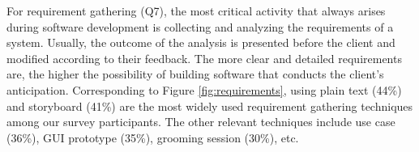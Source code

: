 % 
% 
% 
% 
For requirement gathering (Q7), the most critical activity that always arises
during software development is collecting and analyzing the requirements of a
system. Usually, the outcome of the analysis is presented before the client and
modified according to their feedback. The more clear and detailed requirements
are, the higher the possibility of building software that conducts the client’s
anticipation. Corresponding to Figure \ref{fig:requirements}, using plain text
(44\%) and storyboard (41\%) are the most widely used requirement gathering
techniques among our survey participants. The other relevant techniques include
use case (36\%), GUI prototype (35\%), grooming session (30\%), etc. 

